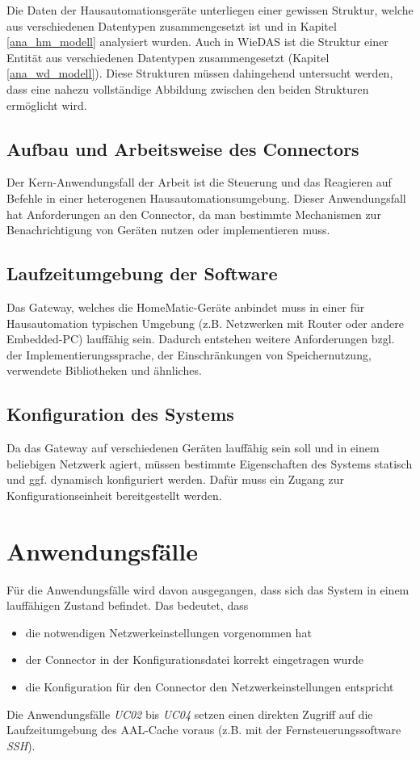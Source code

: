 Die Daten der Hausautomationsgeräte unterliegen einer gewissen Struktur, welche aus verschiedenen
Datentypen zusammengesetzt ist und in Kapitel \ref{ana_hm_modell} analysiert wurden.
Auch in WieDAS ist die Struktur einer Entität aus verschiedenen Datentypen zusammengesetzt (Kapitel \ref{ana_wd_modell}).
Diese Strukturen müssen dahingehend untersucht werden, dass eine nahezu vollständige Abbildung
zwischen den beiden Strukturen ermöglicht wird.

\subsection{Aufbau und Arbeitsweise des Connectors}

Der Kern-Anwendungsfall der Arbeit ist die Steuerung und das Reagieren auf Befehle in einer
heterogenen Hausautomationsumgebung.
Dieser Anwendungsfall hat Anforderungen an den Connector, da man bestimmte Mechanismen zur
Benachrichtigung von Geräten nutzen oder implementieren muss.

\subsection{Laufzeitumgebung der Software}

Das Gateway, welches die HomeMatic-Geräte anbindet muss in einer für Hausautomation typischen
Umgebung (z.B. Netzwerken mit Router oder andere Embedded-PC) lauffähig sein.
Dadurch entstehen weitere Anforderungen bzgl. der Implementierungssprache, der Einschränkungen
von Speichernutzung, verwendete Bibliotheken und ähnliches.

\subsection{Konfiguration des Systems}

Da das Gateway auf verschiedenen Geräten lauffähig sein soll und in einem beliebigen Netzwerk
agiert, müssen bestimmte Eigenschaften des Systems statisch und ggf. dynamisch konfiguriert werden.
Dafür muss ein Zugang zur Konfigurationseinheit bereitgestellt werden.

\section{Anwendungsfälle}
\label{ana_uc}

Für die Anwendungsfälle wird davon ausgegangen, dass sich das System in einem lauffähigen Zustand
befindet.
Das bedeutet, dass
\begin{itemize}
\item die notwendigen Netzwerkeinstellungen vorgenommen hat
\item der Connector in der Konfigurationsdatei korrekt eingetragen wurde
\item die Konfiguration für den Connector den Netzwerkeinstellungen entspricht
\end{itemize}
Die Anwendungsfälle \emph{UC02} bis \emph{UC04} setzen einen direkten Zugriff
auf die Laufzeitumgebung des AAL-Cache voraus (z.B. mit der Fernsteuerungssoftware \emph{SSH}).

